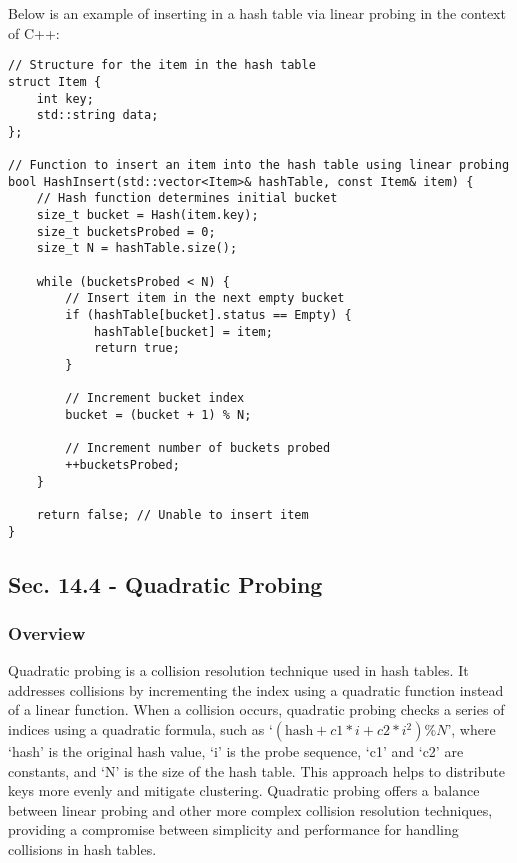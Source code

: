\begin{solution}

Below is an example of inserting in a hash table via linear probing in the context of C++:

\horizontalline

\begin{verbatim}
// Structure for the item in the hash table
struct Item {
    int key;
    std::string data;
};

// Function to insert an item into the hash table using linear probing
bool HashInsert(std::vector<Item>& hashTable, const Item& item) {
    // Hash function determines initial bucket
    size_t bucket = Hash(item.key);
    size_t bucketsProbed = 0;
    size_t N = hashTable.size();

    while (bucketsProbed < N) {
        // Insert item in the next empty bucket
        if (hashTable[bucket].status == Empty) {
            hashTable[bucket] = item;
            return true;
        }

        // Increment bucket index
        bucket = (bucket + 1) % N;

        // Increment number of buckets probed
        ++bucketsProbed;
    }

    return false; // Unable to insert item
}
\end{verbatim}

\horizontalline

\end{solution}

\subsection*{Sec. 14.4 - Quadratic Probing}

\subsubsection{Overview}

Quadratic probing is a collision resolution technique used in hash tables. It addresses collisions by incrementing the index using a quadratic function instead of a linear function. When a collision 
occurs, quadratic probing checks a series of indices using a quadratic formula, such as `$(\text{hash} + c1 * i + c2 * i^2) \% N$', where `hash' is the original hash value, `i' is the probe sequence, 
`c1' and `c2' are constants, and `N' is the size of the hash table. This approach helps to distribute keys more evenly and mitigate clustering. Quadratic probing offers a balance between linear probing 
and other more complex collision resolution techniques, providing a compromise between simplicity and performance for handling collisions in hash tables.

